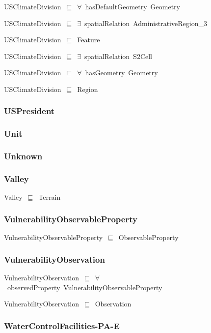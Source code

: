 \documentclass{article}
\begin{document}
USClimateDivision~\ensuremath{\sqsubseteq}~\ensuremath{\forall}~hasDefaultGeometry~Geometry~

USClimateDivision~\ensuremath{\sqsubseteq}~\ensuremath{\exists}~spatialRelation~AdministrativeRegion\_3~

USClimateDivision~\ensuremath{\sqsubseteq}~Feature~

USClimateDivision~\ensuremath{\sqsubseteq}~\ensuremath{\exists}~spatialRelation~S2Cell~

USClimateDivision~\ensuremath{\sqsubseteq}~\ensuremath{\forall}~hasGeometry~Geometry~

USClimateDivision~\ensuremath{\sqsubseteq}~Region~

\subsubsection*{USPresident}

\subsubsection*{Unit}

\subsubsection*{Unknown}

\subsubsection*{Valley}

Valley~\ensuremath{\sqsubseteq}~Terrain~

\subsubsection*{VulnerabilityObservableProperty}

VulnerabilityObservableProperty~\ensuremath{\sqsubseteq}~ObservableProperty~

\subsubsection*{VulnerabilityObservation}

VulnerabilityObservation~\ensuremath{\sqsubseteq}~\ensuremath{\forall}~observedProperty~VulnerabilityObservableProperty~

VulnerabilityObservation~\ensuremath{\sqsubseteq}~Observation~

\subsubsection*{WaterControlFacilities-PA-E}
\end{document}
